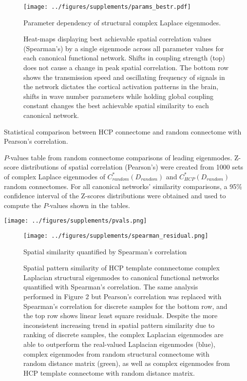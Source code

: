 \begin{figure}[htbp]
\centering
\texttt{[image: ../figures/supplements/params\_bestr.pdf]}
\caption{Parameter dependency of structural complex Laplace eigenmodes.}
\caption*{Heat-maps displaying best achievable spatial correlation values (Spearman's) by a single eigenmode across all parameter values for each canonical functional network. Shifts in coupling strength (top) does not cause a change in peak spatial correlation. The bottom row shows the transmission speed and oscillating frequency of signals in the network dictates the cortical activation patterns in the brain, shifts in wave number parameters while holding global coupling constant changes the best achievable spatial similarity to each canonical network.}
\label{fig:S1}
\end{figure}

\begin{table}[htbp]
\centering
\caption{Statistical comparison between HCP connectome and random connectome with Pearson's correlation.}
\caption*{$P$-values table from random connectome comparisons of leading eigenmodes. Z-score distributions of spatial correlation (Pearson's) were created from 1000 sets of complex Laplace eigenmodes of  $C_{random}^{*}(D_{random})$ and $C_{HCP}^{*}(D_{random})$ random connectomes. For all canonical networks' similarity comparisons, a 95\% confidence interval of the Z-scores distributions were obtained and used to compute the $P$-values shown in the tables.}
\texttt{[image: ../figures/supplements/pvals.png]}
\label{tab:S1}
\end{table}

\begin{figure}[htbp]
\texttt{[image: ../figures/supplements/spearman\_residual.png]}
\caption{Spatial similarity quantified by Spearman's correlation}
\caption*{Spatial pattern similarity of HCP template connnectome complex Laplacian structural eigenmodes to canonical functional networks quantified with Spearman's correlation. The same analysis performed in Figure 2 but Pearson's correlation was replaced with Spearman's correlation for discrete samples for the bottom row, and the top row shows linear least square residuals. Despite the more inconsistent increasing trend in spatial pattern similarity due to ranking of discrete samples, the complex Laplacian eigenmodes are able to outperform the real-valued Laplacian eigenmodes (blue), complex eigenmodes from random structural connectome with random distance matrix (green), as well as complex eigenmodes from HCP template connectome with random distance matrix.}
\label{fig:S2}
\end{figure}

